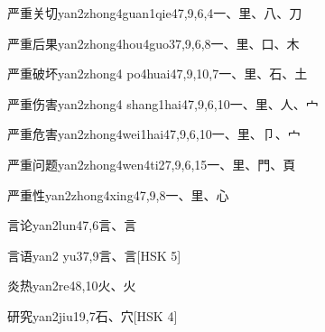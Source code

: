 \begin{entry}{严重关切}{yan2zhong4guan1qie4}{7,9,6,4}{⼀、⾥、⼋、⼑}
\end{entry}

\begin{entry}{严重后果}{yan2zhong4hou4guo3}{7,9,6,8}{⼀、⾥、⼝、⽊}
\end{entry}

\begin{entry}{严重破坏}{yan2zhong4 po4huai4}{7,9,10,7}{⼀、⾥、⽯、⼟}
\end{entry}

\begin{entry}{严重伤害}{yan2zhong4 shang1hai4}{7,9,6,10}{⼀、⾥、⼈、⼧}
\end{entry}

\begin{entry}{严重危害}{yan2zhong4wei1hai4}{7,9,6,10}{⼀、⾥、⼙、⼧}
\end{entry}

\begin{entry}{严重问题}{yan2zhong4wen4ti2}{7,9,6,15}{⼀、⾥、⾨、⾴}
\end{entry}

\begin{entry}{严重性}{yan2zhong4xing4}{7,9,8}{⼀、⾥、⼼}
\end{entry}

\begin{entry}{言论}{yan2lun4}{7,6}{⾔、⾔}
\end{entry}

\begin{entry}{言语}{yan2 yu3}{7,9}{⾔、⾔}[HSK 5]
\end{entry}

\begin{entry}{炎热}{yan2re4}{8,10}{⽕、⽕}
\end{entry}

\begin{entry}{研究}{yan2jiu1}{9,7}{⽯、⽳}[HSK 4]
\end{entry}

